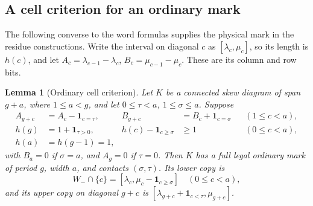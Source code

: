 \documentclass[11pt,a4paper]{amsart}
\numberwithin{equation}{section}
\theoremstyle{plain}
\newtheorem{lemma}[theorem]{Lemma}
\theoremstyle{definition}
\begin{document}
\subsection{A cell criterion for an ordinary mark}\label{ge:ordinary-cell}

The following converse to the word formulas supplies the physical mark
in the residue constructions.  Write the interval on diagonal \(c\) as
\([\lambda_c,\mu_c]\), so its length is \(h(c)\), and let
\(A_c=\lambda_{c-1}-\lambda_c\),
\(B_c=\mu_{c-1}-\mu_c\).  These are its column and row bits.

\begin{lemma}[Ordinary cell criterion]\label{ge:cell-criterion}
Let \(K\) be a connected skew diagram of span \(g+a\), where
\(1\le a<g\), and let \(0\le\tau<a\), \(1\le\sigma\le a\).
Suppose
\begin{align*}
 A_{g+c}&=A_c-\mathbf1_{c=\tau},&
 B_{g+c}&=B_c+\mathbf1_{c=\sigma} &&(1\le c<a),\\
 h(g)&=1+\mathbf1_{\tau>0},&
 h(c)-\mathbf1_{c\ge\sigma}&\ge1 &&(0\le c<a),\\
 h(a)&=h(g-1)=1,
\end{align*}
with \(B_a=0\) if \(\sigma=a\), and \(A_g=0\) if \(\tau=0\).
Then \(K\) has a full legal ordinary mark of period \(g\), width
\(a\), and contacts \((\sigma,\tau)\).  Its lower copy is
\[
 W_-\cap\{c\}=[\lambda_c,\mu_c-\mathbf1_{c\ge\sigma}]
 \quad(0\le c<a),
\]
and its upper copy on diagonal \(g+c\) is
\([\lambda_{g+c}+\mathbf1_{c<\tau},\mu_{g+c}]\).
\end{lemma}
\end{document}
